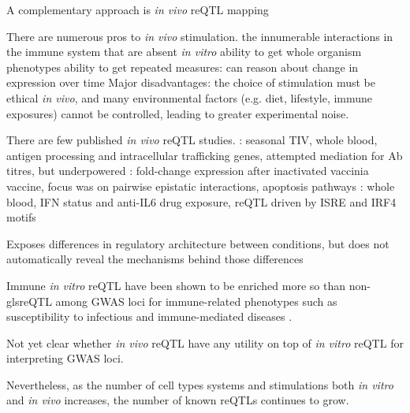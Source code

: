 \begin{outline}
\1 A complementary approach is \textit{in vivo} \gls{reQTL} mapping

    \2 There are numerous pros to \textit{in vivo} stimulation.
        \3 the innumerable interactions in the immune system that are absent \textit{in vitro}
        \3 ability to get whole organism phenotypes
        \3 ability to get repeated measures: can reason about change in expression over time
    \2 Major disadvantages: 
        the choice of stimulation must be ethical \textit{in vivo}, 
        and many environmental factors (e.g. diet, lifestyle, immune exposures) cannot be controlled, leading to greater experimental noise.

    \2 There are few published \textit{in vivo} \gls{reQTL} studies.
        \3 \autocite{franco2013IntegrativeGenomicAnalysis}: seasonal \gls{TIV}, whole blood, antigen processing and intracellular trafficking genes, attempted mediation for Ab titres, but underpowered
        \3 \autocite{lareau2016InteractionQuantitativeTrait}: fold-change expression after inactivated vaccinia vaccine, focus was on pairwise epistatic interactions, apoptosis pathways
        \3 \autocite{davenport2018DiscoveringVivoCytokineeQTL}: whole blood, IFN status and anti-IL6 drug exposure, reQTL driven by ISRE and IRF4 motifs


    \2 Exposes differences in regulatory architecture between conditions, but does not automatically reveal the mechanisms behind those differences 

    \2 Immune \textit{in vitro} \gls{reQTL} have been shown to be enriched more so than non-gls{reQTL} among GWAS loci for immune-related phenotypes such as
    susceptibility to infectious \autocite{barreiro2012DecipheringGeneticArchitecture,manry2017DecipheringGeneticControl}
    and immune-mediated diseases \autocite{manry2017DecipheringGeneticControl,kim-hellmuth2017GeneticRegulatoryEffects}.

    \2 Not yet clear whether \textit{in vivo} reQTL have any utility on top of \textit{in vitro} reQTL for interpreting GWAS loci.

    \2 Nevertheless, as the number of cell types systems and stimulations both \textit{in vitro} and \textit{in vivo} increases, the number of known reQTLs continues to grow.


\end{outline}
